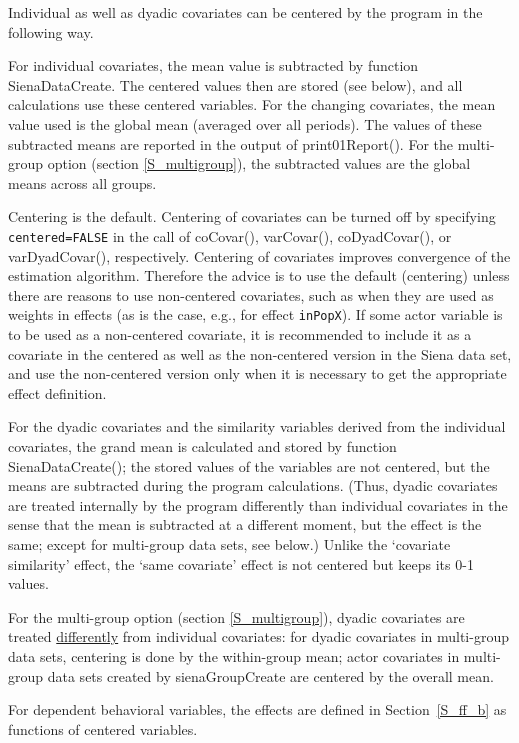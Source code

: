 \documentclass[a4paper,fleqn,11pt]{article}
\newcommand{\+}{\, + \,}
\newcommand{\sfn}[1]{\textsf{#1}}
\begin{document}
Individual as well as dyadic covariates can be centered
by the program in the following way.

For individual covariates, the mean value is subtracted
by function \sfn{SienaDataCreate}. The centered values then are stored
(see below),
and all calculations use these centered variables.
For the changing covariates, the mean
value used is the global mean (averaged over all periods).
The values of these subtracted means are reported in the output
of \sfn{print01Report()}.
For the multi-group option (section \ref{S_multigroup}),
the subtracted values are the global means across all groups.

Centering is the default.
Centering of covariates can be turned off by specifying
\texttt{centered=FALSE} in the call of \sfn{coCovar()},
\sfn{varCovar()}, \sfn{coDyadCovar()}, or \sfn{varDyadCovar()}, respectively.
Centering of covariates improves
convergence of the estimation algorithm.
Therefore the advice is to use the default (centering) unless there are reasons to
use non-centered covariates, such as when they are used as weights in effects
(as is the case, e.g., for effect \texttt{inPopX}).
If some actor variable is to be used as a non-centered covariate,
it is recommended to include it as a covariate in the centered
as well as the non-centered version in the Siena data set,
and use the non-centered version only when it is necessary
to get the appropriate effect definition.

For the dyadic covariates and the similarity variables derived
from the individual covariates, the grand mean is calculated
and stored by function \sfn{SienaDataCreate()};
the stored values of the variables are not centered, but the means
are subtracted during the program calculations. (Thus,
dyadic covariates are treated internally by the program differently than
individual covariates in the sense that the mean is subtracted at
a different moment, but the effect is the same; except for multi-group
data sets, see below.)
Unlike the `covariate similarity' effect,
the `same covariate' effect is not centered but keeps its 0-1 values.

For the multi-group option (section \ref{S_multigroup}),
dyadic covariates are treated \underline{differently} from
individual covariates:
for dyadic covariates in multi-group data sets, centering is done by the
within-group mean;
actor covariates in multi-group data sets  created by \sfn{sienaGroupCreate}
are centered by the overall mean.

For dependent behavioral variables, the effects are defined
in Section~\ref{S_ff_b} as functions of centered variables.
\end{document}
